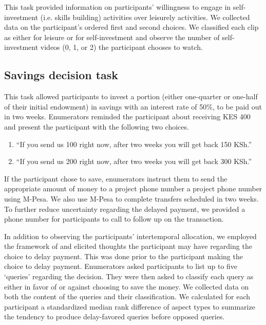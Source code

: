 \documentclass[11pt, a4paper]{article}\usepackage[]{graphicx}\usepackage[]{color}
\begin{document}
        This task provided information on participants' willingness to engage in self-investment (i.e. skills building) activities over leisurely activities. We collected data on the participant's ordered first and second choices. We classified each clip as either for leisure or for self-investment and observe the number of self-investment videos (0, 1, or 2) the participant chooses to watch.

    \subsection{Savings decision task}

        This task allowed participants to invest a portion (either one-quarter or one-half of their initial endowment) in savings with an interest rate of 50\%, to be paid out in two weeks. Enumerators reminded the participant about receiving KES 400 and present the participant with the following two choices.

        \begin{enumerate}
        \itemsep0em
            \item ``If you send us 100 right now, after two weeks you will get back 150 KSh.''
            \item ``If you send us 200 right now, after two weeks you will get back 300 KSh.''
        \end{enumerate}

        If the participant chose to save, enumerators instruct them to send the appropriate amount of money to a project phone number a project phone number using M-Pesa. We also use M-Pesa to complete transfers scheduled in two weeks. To further reduce uncertainty regarding the delayed payment, we provided a phone number for participants to call to follow up on the transaction.

        In addition to observing the participants' intertemporal allocation, we employed the framework of \textcite{johnson_aspects_2007} and elicited thoughts the participant may have regarding the choice to delay payment. This was done prior to the participant making the choice to delay payment. Enumerators asked participants to list up to five `queries' regarding the decision. They were then asked to classify each query as either in favor of or against choosing to save the money. We collected data on both the content of the queries and their classification. We calculated for each participant a standardized median rank difference of aspect types to summarize the tendency to produce delay-favored queries before opposed queries.
\end{document}
